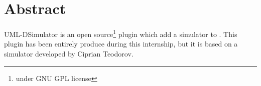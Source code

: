 \chapter*{Abstract}

UML-DSimulator is an open source\footnote{under GNU GPL license} plugin which add a simulator to \umld. This plugin has been entirely produce during this internship, but it is based on a simulator developed by Ciprian Teodorov.



